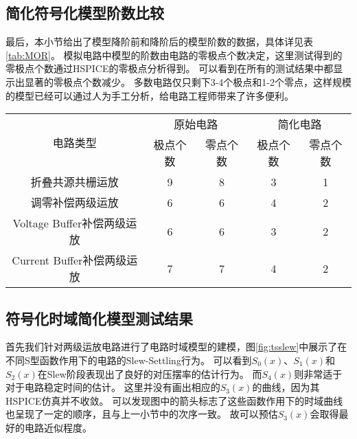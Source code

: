 \subsection{简化符号化模型阶数比较}
\label{subsec:simp:res:order}

最后，本小节给出了模型降阶前和降阶后的模型阶数的数据，具体详见表\ref{tab:MOR}。
模拟电路中模型的阶数由电路的零极点个数决定，这里测试得到的零极点个数通过HSPICE的零极点分析得到。
可以看到在所有的测试结果中都显示出显著的零极点个数减少。
多数电路仅只剩下3-4个极点和1-2个零点，这样规模的模型已经可以通过人为手工分析，给电路工程师带来了许多便利。

\begin{table}[!htbp]
	\centering
	\begin{tabular}{c|c|c|c|c}
		\hline
		\multirow{2}{*}{电路类型} & \multicolumn{2}{c|}{原始电路} & \multicolumn{2}{c}{简化电路} \\ \cline{2-5}
		                      & 极点个数 &        零点个数        & 极点个数 &       零点个数        \\ \hline
		      折叠共源共栅运放        &  9   &         8          &  3   &         1         \\
		      调零补偿两级运放        &  6   &         6          &  4   &         2         \\
		Voltage Buffer补偿两级运放  &  6   &         6          &  3   &         2         \\
		Current Buffer补偿两级运放  &  7   &         7          &  4   &         2         \\ \hline
	\end{tabular}
\end{table}

\subsection{符号化时域简化模型测试结果}

首先我们针对两级运放电路进行了电路时域模型的建模，图\ref{fig:tsslew}中展示了在不同S型函数作用下的电路的Slew-Settling行为。
可以看到$S_0\left(x\right)$、$S_1\left(x\right)$和$S_2\left(x\right)$在Slew阶段表现出了良好的对压摆率的估计行为。
而$S_4\left(x\right)$则非常适于对于电路稳定时间的估计。
这里并没有画出相应的$S_3\left(x\right)$的曲线，因为其HSPICE仿真并不收敛。
可以发现图中的箭头标志了这些函数作用下的时域曲线也呈现了一定的顺序，且与上一小节中的次序一致。
故可以预估$S_3\left(x\right)$会取得最好的电路近似程度。

